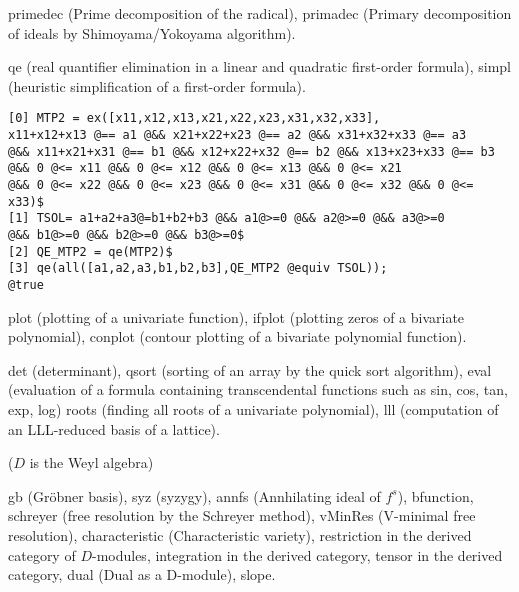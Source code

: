 \medbreak
\noindent
{}

\noindent
{primedec} (Prime decomposition of the radical),
{primadec} (Primary decomposition of ideals by Shimoyama/Yokoyama algorithm).

\medbreak
\noindent
{}

\noindent
{qe} (real quantifier elimination in a linear and
quadratic first-order formula),
{simpl} (heuristic simplification of a first-order formula).

{\scriptsize
\begin{verbatim}
[0] MTP2 = ex([x11,x12,x13,x21,x22,x23,x31,x32,x33],
x11+x12+x13 @== a1 @&& x21+x22+x23 @== a2 @&& x31+x32+x33 @== a3
@&& x11+x21+x31 @== b1 @&& x12+x22+x32 @== b2 @&& x13+x23+x33 @== b3
@&& 0 @<= x11 @&& 0 @<= x12 @&& 0 @<= x13 @&& 0 @<= x21
@&& 0 @<= x22 @&& 0 @<= x23 @&& 0 @<= x31 @&& 0 @<= x32 @&& 0 @<= x33)$
[1] TSOL= a1+a2+a3@=b1+b2+b3 @&& a1@>=0 @&& a2@>=0 @&& a3@>=0
@&& b1@>=0 @&& b2@>=0 @&& b3@>=0$
[2] QE_MTP2 = qe(MTP2)$
[3] qe(all([a1,a2,a3,b1,b2,b3],QE_MTP2 @equiv TSOL));
@true
\end{verbatim}}

\medbreak
\noindent
{}

\noindent
{plot} (plotting of a univariate function),
{ifplot} (plotting zeros of a bivariate polynomial),
{conplot} (contour plotting of a bivariate polynomial function).

\medbreak
\noindent
{}

\noindent
{det} (determinant),
{qsort} (sorting of an array by the quick sort algorithm),
{eval} (evaluation of a formula containing transcendental functions
such as
{sin}, {cos}, {tan}, {exp},
{log})
{roots} (finding all roots of a univariate polynomial),
{lll} (computation of an LLL-reduced basis of a lattice).

\medbreak
\noindent
{} ($D$ is the Weyl algebra)

\noindent
{gb } (Gr\"obner basis),
{syz} (syzygy),
{annfs} (Annhilating ideal of $f^s$),
{bfunction},
{schreyer} (free resolution by the Schreyer method),
{vMinRes} (V-minimal free resolution),
{characteristic} (Characteristic variety),
{restriction} in the derived category of $D$-modules,
{integration} in the derived category,
{tensor}  in the derived category,
{dual} (Dual as a D-module),
{slope}.

\medbreak
\noindent
{}

